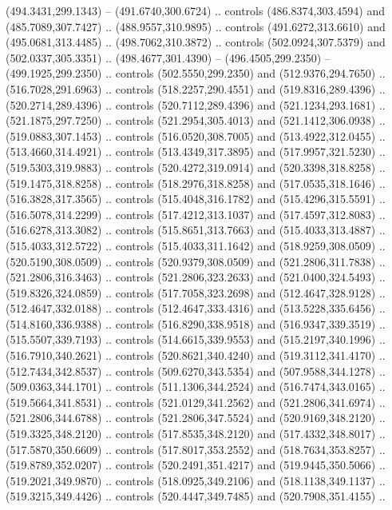 \begin{scope}[cm={{1.25,0.0,0.0,-1.25,(0.0,743.43331)}}]
    (494.3431,299.1343) -- (491.6740,300.6724) .. controls (486.8374,303.4594) and
    (485.7089,307.7427) .. (488.9557,310.9895) .. controls (491.6272,313.6610) and
    (495.0681,313.4485) .. (498.7062,310.3872) .. controls (502.0924,307.5379) and
    (502.0337,305.3351) .. (498.4677,301.4390) -- (496.4505,299.2350) --
    (499.1925,299.2350) .. controls (502.5550,299.2350) and (512.9376,294.7650) ..
    (516.7028,291.6963) .. controls (518.2257,290.4551) and (519.8316,289.4396) ..
    (520.2714,289.4396) .. controls (520.7112,289.4396) and (521.1234,293.1681) ..
    (521.1875,297.7250) .. controls (521.2954,305.4013) and (521.1412,306.0938) ..
    (519.0883,307.1453) .. controls (516.0520,308.7005) and (513.4922,312.0455) ..
    (513.4660,314.4921) .. controls (513.4349,317.3895) and (517.9957,321.5230) ..
    (519.5303,319.9883) .. controls (520.4272,319.0914) and (520.3398,318.8258) ..
    (519.1475,318.8258) .. controls (518.2976,318.8258) and (517.0535,318.1646) ..
    (516.3828,317.3565) .. controls (515.4048,316.1782) and (515.4296,315.5591) ..
    (516.5078,314.2299) .. controls (517.4212,313.1037) and (517.4597,312.8083) ..
    (516.6278,313.3082) .. controls (515.8651,313.7663) and (515.4033,313.4887) ..
    (515.4033,312.5722) .. controls (515.4033,311.1642) and (518.9259,308.0509) ..
    (520.5190,308.0509) .. controls (520.9379,308.0509) and (521.2806,311.7838) ..
    (521.2806,316.3463) .. controls (521.2806,323.2633) and (521.0400,324.5493) ..
    (519.8326,324.0859) .. controls (517.7058,323.2698) and (512.4647,328.9128) ..
    (512.4647,332.0188) .. controls (512.4647,333.4316) and (513.5228,335.6456) ..
    (514.8160,336.9388) .. controls (516.8290,338.9518) and (516.9347,339.3519) ..
    (515.5507,339.7193) .. controls (514.6615,339.9553) and (515.2197,340.1996) ..
    (516.7910,340.2621) .. controls (520.8621,340.4240) and (519.3112,341.4170) ..
    (512.7434,342.8537) .. controls (509.6270,343.5354) and (507.9588,344.1278) ..
    (509.0363,344.1701) .. controls (511.1306,344.2524) and (516.7474,343.0165) ..
    (519.5664,341.8531) .. controls (521.0129,341.2562) and (521.2806,341.6974) ..
    (521.2806,344.6788) .. controls (521.2806,347.5524) and (520.9169,348.2120) ..
    (519.3325,348.2120) .. controls (517.8535,348.2120) and (517.4332,348.8017) ..
    (517.5870,350.6609) .. controls (517.8017,353.2552) and (518.7634,353.8257) ..
    (519.8789,352.0207) .. controls (520.2491,351.4217) and (519.9445,350.5066) ..
    (519.2021,349.9870) .. controls (518.0925,349.2106) and (518.1138,349.1137) ..
    (519.3215,349.4426) .. controls (520.4447,349.7485) and (520.7908,351.4155) ..

\end{scope}
